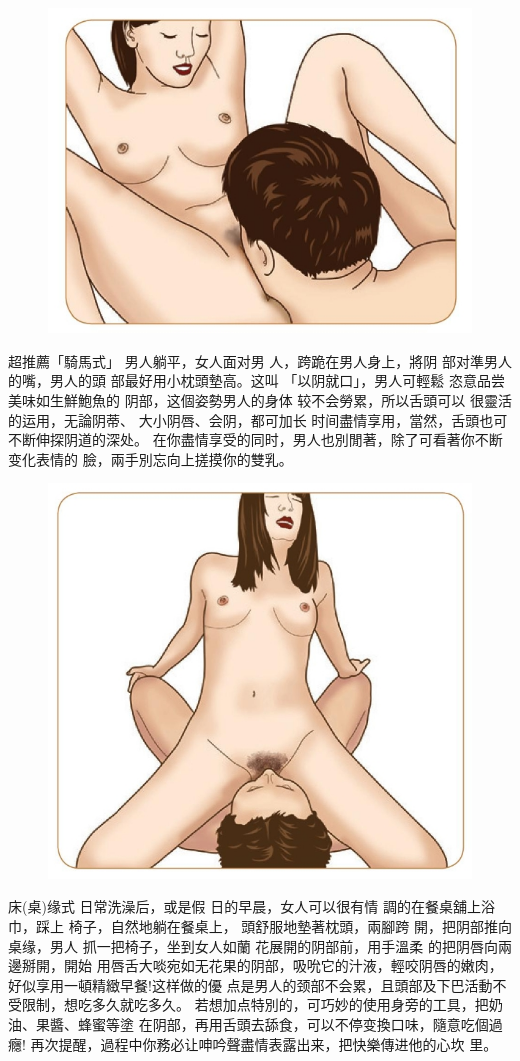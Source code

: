 \documentclass[12pt,UTF8]{ctexbook}
\begin{document}
\begin{figure}[htbp]
	\centering
	\includegraphics[width=0.7\linewidth]{21}
	\caption{}
	\label{fig:1}
\end{figure}

超推薦「騎馬式」
男人躺平，女人面对男
人，跨跪在男人身上，將阴
部对準男人的嘴，男人的頭
部最好用小枕頭墊高。这叫
「以阴就口」，男人可輕鬆
恣意品尝美味如生鮮鮑魚的
阴部，这個姿勢男人的身体
较不会勞累，所以舌頭可以
很靈活的运用，无論阴蒂、
大小阴唇、会阴，都可加长
时间盡情享用，當然，舌頭也可不断伸探阴道的深处。
在你盡情享受的同时，男人也別閒著，除了可看著你不断变化表情的
臉，兩手別忘向上搓摸你的雙乳。

\begin{figure}[htbp]
	\centering
	\includegraphics[width=0.7\linewidth]{22}
	\caption{}
	\label{fig:1}
\end{figure}

床(桌)缘式
日常洗澡后，或是假
日的早晨，女人可以很有情
調的在餐桌舖上浴巾，踩上
椅子，自然地躺在餐桌上，
頭舒服地墊著枕頭，兩腳跨
開，把阴部推向桌缘，男人
抓一把椅子，坐到女人如蘭
花展開的阴部前，用手溫柔
的把阴唇向兩邊掰開，開始
用唇舌大啖宛如无花果的阴部，吸吮它的汁液，輕咬阴唇的嫩肉，好似享用一頓精緻早餐!这样做的優
点是男人的颈部不会累，且頭部及下巴活動不受限制，想吃多久就吃多久。
若想加点特別的，可巧妙的使用身旁的工具，把奶油、果醬、蜂蜜等塗
在阴部，再用舌頭去舔食，可以不停变換口味，隨意吃個過癮!
再次提醒，過程中你務必让呻吟聲盡情表露出来，把快樂傳进他的心坎
里。
\end{document}
